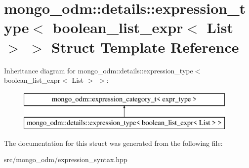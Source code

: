 \hypertarget{structmongo__odm_1_1details_1_1expression__type_3_01boolean__list__expr_3_01List_01_4_01_4}{}\section{mongo\+\_\+odm\+:\+:details\+:\+:expression\+\_\+type$<$ boolean\+\_\+list\+\_\+expr$<$ List $>$ $>$ Struct Template Reference}
\label{structmongo__odm_1_1details_1_1expression__type_3_01boolean__list__expr_3_01List_01_4_01_4}
Inheritance diagram for mongo\+\_\+odm\+:\+:details\+:\+:expression\+\_\+type$<$ boolean\+\_\+list\+\_\+expr$<$ List $>$ $>$\+:\begin{figure}[H]
\begin{center}
\leavevmode
\includegraphics[height=2.000000cm]{structmongo__odm_1_1details_1_1expression__type_3_01boolean__list__expr_3_01List_01_4_01_4}
\end{center}
\end{figure}


The documentation for this struct was generated from the following file\+:\begin{DoxyCompactItemize}
\item 
src/mongo\+\_\+odm/expression\+\_\+syntax.\+hpp\end{DoxyCompactItemize}

